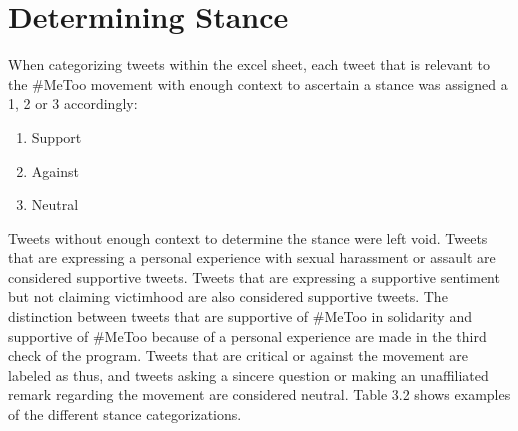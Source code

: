 \section{Determining Stance}

When categorizing tweets within the excel sheet, each tweet that is relevant to the \#MeToo movement with enough context to ascertain a stance was assigned a 1, 2 or 3 accordingly:

\begin{enumerate}
    \item Support
    \item Against
    \item Neutral
\end{enumerate}

Tweets without enough context to determine the stance were left void. Tweets that are expressing a personal experience with sexual harassment or assault are considered supportive tweets. Tweets that are expressing a supportive sentiment but not claiming victimhood are also considered supportive tweets. The distinction between tweets that are supportive of \#MeToo in solidarity and supportive of \#MeToo because of a personal experience are made in the third check of the program. Tweets that are critical or against the movement are labeled as thus, and tweets asking a sincere question or making an unaffiliated remark regarding the movement are considered neutral. Table 3.2 shows examples of the different stance categorizations.

